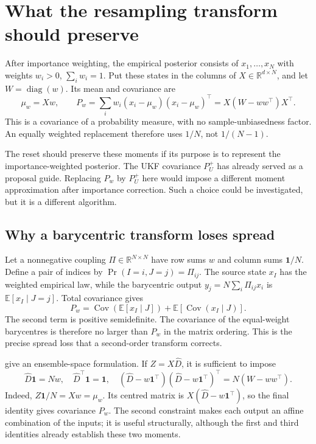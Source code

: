 \documentclass[11pt,a4paper]{article}
\newcommand{\R}{\mathbb R}
\newcommand{\E}{\mathbb E}
\newcommand{\Cov}{\operatorname{Cov}}
\newcommand{\diag}{\operatorname{diag}}
\newcommand{\one}{\mathbf 1}
\begin{document}
\section{What the resampling transform should preserve}

After importance weighting, the empirical posterior consists of
\(x_1,\ldots,x_N\) with weights \(w_i>0\), \(\sum_iw_i=1\). Put these states
in the columns of \(X\in\R^{d\times N}\), and let \(W=\diag(w)\). Its mean
and covariance are
\begin{equation}
\label{eq:weighted-moments}
 \mu_w=Xw,\qquad
 P_w=\sum_iw_i(x_i-\mu_w)(x_i-\mu_w)^\top
     =X(W-ww^\top)X^\top .
\end{equation}
This is a covariance of a probability measure, with no sample-unbiasedness
factor. An equally weighted replacement therefore uses \(1/N\), not
\(1/(N-1)\).

The reset should preserve these moments if its purpose is to represent
the importance-weighted posterior. The UKF covariance \(P_U^+\) has already
served as a proposal guide. Replacing \(P_w\) by \(P_U^+\) here would impose
a different moment approximation after importance correction. Such a
choice could be investigated, but it is a different algorithm.

\subsection{Why a barycentric transform loses spread}

Let a nonnegative coupling \(\Pi\in\R^{N\times N}\) have row sums \(w\)
and column sums \(\one/N\). Define a pair of indices by
\(\Pr(I=i,J=j)=\Pi_{ij}\). The source state \(x_I\) has the weighted
empirical law, while the barycentric output
\(y_j=N\sum_i\Pi_{ij}x_i\) is \(\E[x_I\mid J=j]\). Total covariance gives
\begin{equation}
\label{eq:barycentric-loss}
 P_w
 =\Cov\!\left(\E[x_I\mid J]\right)
  +\E\!\left[\Cov(x_I\mid J)\right].
\end{equation}
The second term is positive semidefinite. The covariance of the equal-weight
barycentres is therefore no larger than \(P_w\) in the matrix ordering.
This is the precise spread loss that a second-order transform corrects.

\citet[Definition 3.1 and Sections 4--6]{acevedo2017} give an ensemble-space
formulation. If \(Z=X\widehat D\), it is sufficient to impose
\begin{equation}
\label{eq:transform-constraints}
 \widehat D\one=Nw,\quad
 \widehat D^\top\one=\one,\quad
 (\widehat D-w\one^\top)(\widehat D-w\one^\top)^\top
       =N(W-ww^\top).
\end{equation}
Indeed, \(Z\one/N=Xw=\mu_w\). Its centred matrix is
\(X(\widehat D-w\one^\top)\), so the final identity gives covariance \(P_w\).
The second constraint makes each output an affine combination of the inputs;
it is useful structurally, although the first and third identities already
establish these two moments.
\end{document}
